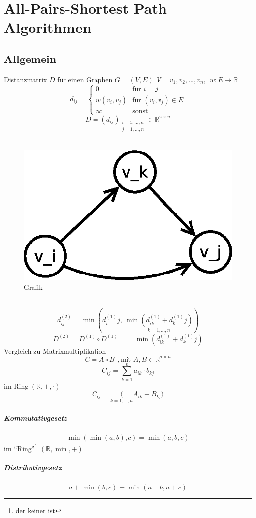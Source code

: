 \chapter{All-Pairs-Shortest Path Algorithmen}
\section{Allgemein} %
Distanzmatrix $D$ für einen Graphen $G=(V,E)~~V={v_1,v_2,\ldots,v_n},~~w:E\mapsto\mathbb{R}$
\[ d_{ij}=\begin{cases}0&\text{für }i=j\\w(v_i,v_j)&\text{für }(v_i,v_j)\in E\\ \infty &\text{sonst}\end{cases} \]
\[D=(d_{ij})_{\substack{i=1,\ldots,n \\ j=1,\ldots, n}} \in \mathbb{R}^{n\times n}  \]
$ $
\begin{figure}
	\vspace*{-100pt}
\centering
\includegraphics[width=0.5\linewidth]{18/Grafik/Diagramm1}
\caption{Grafik}
\label{fig:Diagramm1}
\end{figure}
$ $
\[ d^{(2)}_{ij} = \min(d^{(1)}_ij,~\underset{k=1,\ldots,n}{\min(d^{(1)}_{ik}+d^{(1)}_kj)}) \]
\[ D^{(2)} = D^{(1)}\circ D^{(1)}~~~~~=\min(d^{(1)}_{ik}+d^{(1)}_kj) \]
Vergleich zu Matrixmultiplikation
\[ C=A \circ B~~,\text{mit }A,B\in\mathbb{R}^{n\times n} \]
\[ C_{ij} = \sum_{k=1}^{n}a_{ik}\cdot b_{kj} \]
im Ring $(\mathbb{R},+,\cdot)$
\[ C_{ij} =  \underset{k=1,\ldots,n} (A_{ik}+B_{kj}) \]
\paragraph{Kommutativgesetz}
\[ \min(\min(a,b),c) = \min(a,b,c)\]
im "`Ring"'\footnote{der keiner ist} $(\mathbb{R}, \min, +)$
\paragraph{Distributivgesetz}
\[ a+\min(b,c) = \min(a+b, a+c) \]
